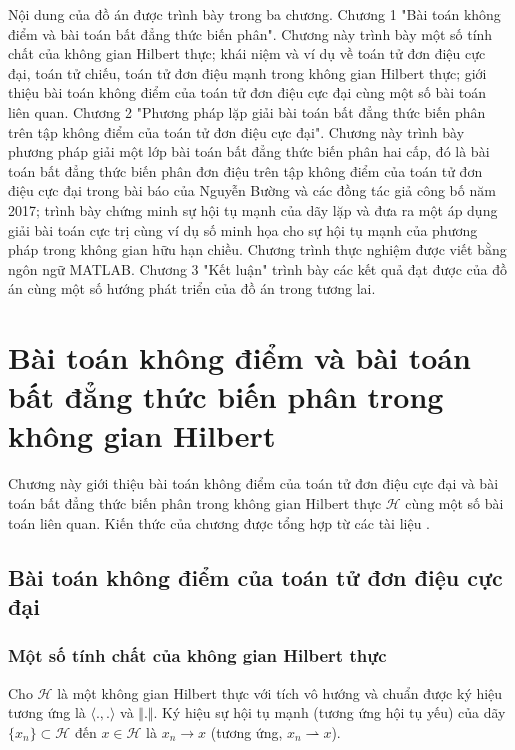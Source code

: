 \documentclass[14pt, oneside,A4paper]{book}
\theoremstyle{plain}
\begin{document}
Nội dung của đồ án được trình bày trong ba chương. Chương 1 "Bài toán không điểm và bài toán bất đẳng thức biến phân". Chương này trình bày một số tính chất của không gian Hilbert thực; khái niệm và ví dụ về toán tử đơn điệu cực đại, toán tử chiếu, toán tử đơn điệu mạnh trong không gian Hilbert thực; giới thiệu bài toán không điểm của toán tử đơn điệu cực đại cùng một số bài toán liên quan. Chương 2 "Phương pháp lặp giải bài toán bất đẳng thức biến phân trên tập không điểm của toán tử đơn điệu cực đại". Chương này trình bày phương pháp giải một lớp bài toán bất đẳng thức biến phân hai cấp, đó là bài toán bất đẳng thức biến phân đơn điệu trên tập không điểm của toán tử đơn điệu cực đại trong bài báo \cite{BHN} của Nguyễn Bường và các đồng tác giả công bố năm 2017; trình bày chứng minh sự hội tụ mạnh của dãy lặp và đưa ra một áp dụng giải bài toán cực trị cùng ví dụ số minh họa cho sự hội tụ mạnh của phương pháp trong không gian hữu hạn chiều. Chương trình thực nghiệm được viết bằng ngôn ngữ MATLAB. Chương 3 "Kết luận" trình bày các kết quả đạt được của đồ án cùng một số hướng phát triển của đồ án trong tương lai.

\chapter{Bài toán không điểm và bài toán bất đẳng thức biến phân trong không gian Hilbert}

Chương này giới thiệu bài toán không điểm của toán tử đơn điệu cực đại và bài toán bất đẳng thức biến phân trong không gian Hilbert thực $\mathcal H$ cùng một số bài toán liên quan. Kiến thức của chương được tổng hợp từ các tài liệu \cite{TT,Tuy,AS,BHN,Kon}.

\section{Bài toán không điểm của toán tử đơn điệu cực đại}

\subsection{Một số tính chất của không gian Hilbert thực}

Cho $\mathcal H$ là một không gian Hilbert thực với tích vô hướng và chuẩn được ký hiệu tương ứng là $\langle ., . \rangle$ và $\Vert . \Vert$. Ký hiệu sự hội tụ mạnh (tương ứng hội tụ yếu) của dãy $\{x_n\}\subset \mathcal H$ đến $x\in \mathcal H$ là $x_n\to x$ (tương ứng, $x_n\rightharpoonup x$).
\end{document}
